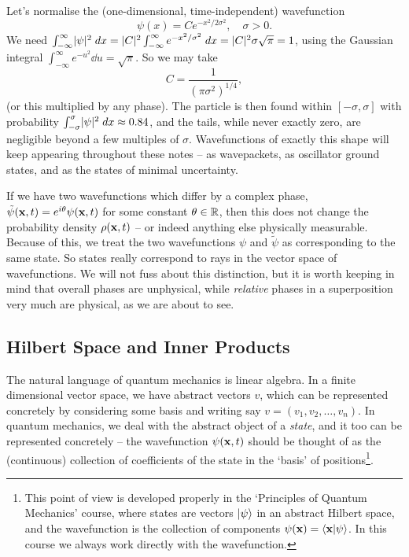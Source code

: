 \documentclass[a4paper]{scrartcl}
\begin{document}
\begin{example}
    Let's normalise the (one-dimensional, time-independent) wavefunction
    $$
    \psi(x) = C e^{-x^2 / 2 \sigma^2}, \quad \sigma > 0.
    $$
    We need $\int_{-\infty}^{\infty} \lvert\psi\rvert^2 \; d x = \lvert C\rvert^2 \int_{-\infty}^{\infty} e^{-x^2/\sigma^2} \; d x = \lvert C\rvert^2 \sigma \sqrt{\pi} = 1$, using the Gaussian integral $\int_{-\infty}^\infty e^{-u^2} \dd u = \sqrt{\pi}$. So we may take
    $$
    C = \frac{1}{(\pi \sigma^2)^{1/4}},
    $$
    (or this multiplied by any phase). The particle is then found within $[-\sigma, \sigma]$ with probability $\int_{-\sigma}^{\sigma} \lvert\psi\rvert^2 \; d x \approx 0.84$, and the tails, while never exactly zero, are negligible beyond a few multiples of $\sigma$. Wavefunctions of exactly this shape will keep appearing throughout these notes -- as wavepackets, as oscillator ground states, and as the states of minimal uncertainty.
\end{example}

\begin{remark}
    If we have two wavefunctions which differ by a complex phase, $\tilde{\psi}(\mathbf{x}, t) = e^{i \theta} \psi(\mathbf{x}, t)$ for some constant $\theta \in \mathbb{R}$, then this does not change the probability density $\rho(\mathbf{x}, t)$ -- or indeed anything else physically measurable. Because of this, we treat the two wavefunctions $\psi$ and $\tilde{\psi}$ as corresponding to the same state. So states really correspond to rays in the vector space of wavefunctions. We will not fuss about this distinction, but it is worth keeping in mind that overall phases are unphysical, while \emph{relative} phases in a superposition very much are physical, as we are about to see.
\end{remark}

\subsection{Hilbert Space and Inner Products}

The natural language of quantum mechanics is linear algebra. In a finite dimensional vector space, we have abstract vectors $v$, which can be represented concretely by considering some basis and writing say $v = (v_1, v_2, \dots, v_n)$. In quantum mechanics, we deal with the abstract object of a \emph{state}, and it too can be represented concretely -- the wavefunction $\psi(\mathbf{x}, t)$ should be thought of as the (continuous) collection of coefficients of the state in the `basis' of positions\footnote{This point of view is developed properly in the `Principles of Quantum Mechanics' course, where states are vectors $\ket{\psi}$ in an abstract Hilbert space, and the wavefunction is the collection of components $\psi(\mathbf{x}) = \langle \mathbf{x} | \psi \rangle$. In this course we always work directly with the wavefunction.}.
\end{document}
